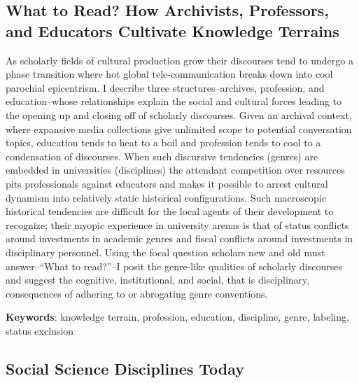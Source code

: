 \documentclass[]{book}
\theoremstyle{definition}
\theoremstyle{definition}
\theoremstyle{definition}
\theoremstyle{remark}
\begin{document}
\hypertarget{what-to-read-how-archivists-professors-and-educators-cultivate-knowledge-terrains}{%
\subsection{What to Read? How Archivists, Professors, and Educators
Cultivate Knowledge
Terrains}\label{what-to-read-how-archivists-professors-and-educators-cultivate-knowledge-terrains}}























As scholarly fields of cultural production grow their
discourses tend to undergo a phase transition where hot global
tele-communication breaks down into cool parochial epicentrism. I
describe three structures--archives, profession, and education--whose
relationships explain the social and cultural forces leading to the
opening up and closing off of scholarly discourses. Given an archival
context, where expansive media collections give unlimited scope to
potential conversation topics, education tends to heat to a boil and
profession tends to cool to a condensation of discourses. When such
discursive tendencies (genres) are embedded in universities
(disciplines) the attendant competition over resources pits
professionals against educators and makes it possible to arrest cultural
dynamism into relatively static historical configurations. Such
macroscopic historical tendencies are difficult for the local agents of
their development to recognize; their myopic experience in university
arenas is that of status conflicts around investments in academic genres
and fiscal conflicts around investments in disciplinary personnel. Using
the focal question scholars new and old must answer--``What to
read?''--I posit the genre-like qualities of scholarly discourses and
suggest the cognitive, institutional, and social, that is disciplinary,
consequences of adhering to or abrogating genre conventions.




\textbf{Keywords}: knowledge terrain, profession, education, discipline,
genre, labeling, status exclusion

\hypertarget{social-science-disciplines-today}{%
\subsection{Social Science Disciplines
Today}\label{social-science-disciplines-today}}
\end{document}
